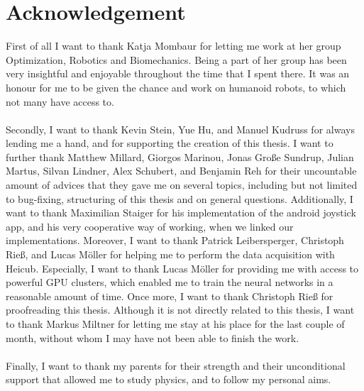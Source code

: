 \chapter{Acknowledgement}
First of all I want to thank Katja Mombaur for letting me work at her group Optimization, Robotics and Biomechanics. Being a part of her group has been very insightful and enjoyable throughout the time that I spent there. It was an honour for me to be given the chance and work on humanoid robots, to which not many have access to.\\\\
Secondly, I want to thank Kevin Stein, Yue Hu, and Manuel Kudruss for always lending me a hand, and for supporting the creation of this thesis. I want to further thank Matthew Millard, Giorgos Marinou, Jonas Große Sundrup, Julian Martus, Silvan Lindner, Alex Schubert, and Benjamin Reh for their uncountable amount of advices that they gave me on several topics, including but not limited to bug-fixing, structuring of this thesis and on general questions. Additionally, I want to thank Maximilian Staiger for his implementation of the android joystick app, and his very cooperative way of working, when we linked our implementations. Moreover, I want to thank Patrick Leibersperger, Christoph Rieß, and Lucas Möller for helping me to perform the data acquisition with Heicub. Especially, I want to thank Lucas Möller for providing me with access to powerful GPU clusters, which enabled me to train the neural networks in a reasonable amount of time. Once more, I want to thank Christoph Rieß for proofreading this thesis. Although it is not directly related to this thesis, I want to thank Markus Miltner for letting me stay at his place for the last couple of month, without whom I may have not been able to finish the work.\\\\
Finally, I want to thank my parents for their strength and their unconditional support that allowed me to study physics, and to follow my personal aims.